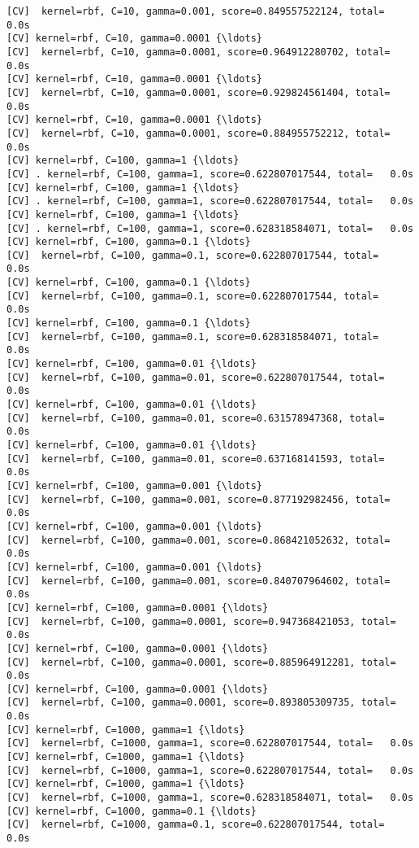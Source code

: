 \documentclass[11pt]{article}
\begin{document}
\begin{Verbatim}[commandchars=\\\{\}]
[CV]  kernel=rbf, C=10, gamma=0.001, score=0.849557522124, total=   0.0s
[CV] kernel=rbf, C=10, gamma=0.0001 {\ldots}
[CV]  kernel=rbf, C=10, gamma=0.0001, score=0.964912280702, total=   0.0s
[CV] kernel=rbf, C=10, gamma=0.0001 {\ldots}
[CV]  kernel=rbf, C=10, gamma=0.0001, score=0.929824561404, total=   0.0s
[CV] kernel=rbf, C=10, gamma=0.0001 {\ldots}
[CV]  kernel=rbf, C=10, gamma=0.0001, score=0.884955752212, total=   0.0s
[CV] kernel=rbf, C=100, gamma=1 {\ldots}
[CV] . kernel=rbf, C=100, gamma=1, score=0.622807017544, total=   0.0s
[CV] kernel=rbf, C=100, gamma=1 {\ldots}
[CV] . kernel=rbf, C=100, gamma=1, score=0.622807017544, total=   0.0s
[CV] kernel=rbf, C=100, gamma=1 {\ldots}
[CV] . kernel=rbf, C=100, gamma=1, score=0.628318584071, total=   0.0s
[CV] kernel=rbf, C=100, gamma=0.1 {\ldots}
[CV]  kernel=rbf, C=100, gamma=0.1, score=0.622807017544, total=   0.0s
[CV] kernel=rbf, C=100, gamma=0.1 {\ldots}
[CV]  kernel=rbf, C=100, gamma=0.1, score=0.622807017544, total=   0.0s
[CV] kernel=rbf, C=100, gamma=0.1 {\ldots}
[CV]  kernel=rbf, C=100, gamma=0.1, score=0.628318584071, total=   0.0s
[CV] kernel=rbf, C=100, gamma=0.01 {\ldots}
[CV]  kernel=rbf, C=100, gamma=0.01, score=0.622807017544, total=   0.0s
[CV] kernel=rbf, C=100, gamma=0.01 {\ldots}
[CV]  kernel=rbf, C=100, gamma=0.01, score=0.631578947368, total=   0.0s
[CV] kernel=rbf, C=100, gamma=0.01 {\ldots}
[CV]  kernel=rbf, C=100, gamma=0.01, score=0.637168141593, total=   0.0s
[CV] kernel=rbf, C=100, gamma=0.001 {\ldots}
[CV]  kernel=rbf, C=100, gamma=0.001, score=0.877192982456, total=   0.0s
[CV] kernel=rbf, C=100, gamma=0.001 {\ldots}
[CV]  kernel=rbf, C=100, gamma=0.001, score=0.868421052632, total=   0.0s
[CV] kernel=rbf, C=100, gamma=0.001 {\ldots}
[CV]  kernel=rbf, C=100, gamma=0.001, score=0.840707964602, total=   0.0s
[CV] kernel=rbf, C=100, gamma=0.0001 {\ldots}
[CV]  kernel=rbf, C=100, gamma=0.0001, score=0.947368421053, total=   0.0s
[CV] kernel=rbf, C=100, gamma=0.0001 {\ldots}
[CV]  kernel=rbf, C=100, gamma=0.0001, score=0.885964912281, total=   0.0s
[CV] kernel=rbf, C=100, gamma=0.0001 {\ldots}
[CV]  kernel=rbf, C=100, gamma=0.0001, score=0.893805309735, total=   0.0s
[CV] kernel=rbf, C=1000, gamma=1 {\ldots}
[CV]  kernel=rbf, C=1000, gamma=1, score=0.622807017544, total=   0.0s
[CV] kernel=rbf, C=1000, gamma=1 {\ldots}
[CV]  kernel=rbf, C=1000, gamma=1, score=0.622807017544, total=   0.0s
[CV] kernel=rbf, C=1000, gamma=1 {\ldots}
[CV]  kernel=rbf, C=1000, gamma=1, score=0.628318584071, total=   0.0s
[CV] kernel=rbf, C=1000, gamma=0.1 {\ldots}
[CV]  kernel=rbf, C=1000, gamma=0.1, score=0.622807017544, total=   0.0s

\end{Verbatim}
\end{document}
